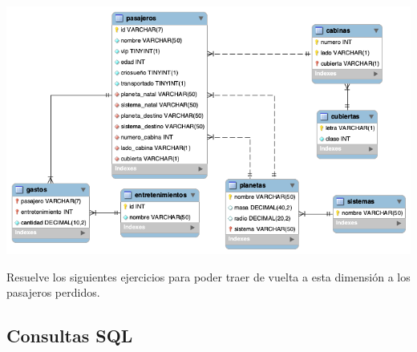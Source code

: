 \documentclass{db-practice}
\begin{document}
\includegraphics[width=\textwidth]{figs/sql/titanic-spaceship-diagram.png}

Resuelve los siguientes ejercicios para poder traer de vuelta a esta dimensión a los pasajeros perdidos.

\subsection*{Consultas SQL}
\end{document}
